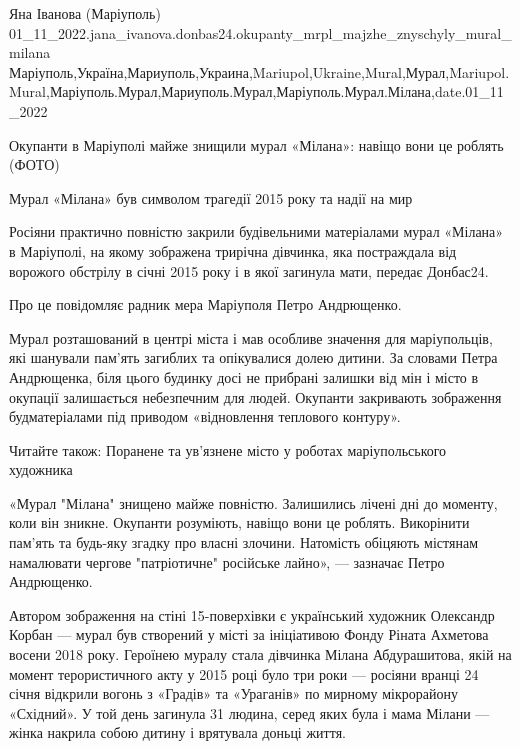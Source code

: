  
 
 
 
 

Яна Іванова (Маріуполь)
01_11_2022.jana_ivanova.donbas24.okupanty_mrpl_majzhe_znyschyly_mural_milana
Маріуполь,Україна,Мариуполь,Украина,Mariupol,Ukraine,Mural,Мурал,Mariupol.Mural,Маріуполь.Мурал,Мариуполь.Мурал,Маріуполь.Мурал.Мілана,date.01_11_2022

Окупанти в Маріуполі майже знищили мурал «Мілана»: навіщо вони це роблять
(ФОТО)

Мурал «Мілана» був символом трагедії 2015 року та надії на мир

Росіяни практично повністю закрили будівельними матеріалами мурал «Мілана» в
Маріуполі, на якому зображена трирічна дівчинка, яка постраждала від ворожого
обстрілу в січні 2015 року і в якої загинула мати, передає Донбас24.

Про це повідомляє радник мера Маріуполя Петро Андрющенко.

Мурал розташований в центрі міста і мав особливе значення для маріупольців, які
шанували пам'ять загиблих та опікувалися долею дитини. За словами Петра
Андрющенка, біля цього будинку досі не прибрані залишки від мін і місто в
окупації залишається небезпечним для людей. Окупанти закривають зображення
будматеріалами під приводом «відновлення теплового контуру».

Читайте також: Поранене та ув'язнене місто у роботах маріупольського художника

«Мурал "Мілана" знищено майже повністю. Залишились лічені дні до моменту, коли
він зникне. Окупанти розуміють, навіщо вони це роблять. Викорінити пам'ять та
будь-яку згадку про власні злочини. Натомість обіцяють містянам намалювати
чергове "патріотичне" російське лайно», — зазначає Петро Андрющенко.

Автором зображення на стіні 15-поверхівки є український художник Олександр
Корбан — мурал був створений у місті за ініціативою Фонду Ріната Ахметова
восени 2018 року. Героїнею муралу стала дівчинка Мілана Абдурашитова, якій на
момент терористичного акту у 2015 році було три роки — росіяни вранці 24 січня
відкрили вогонь з «Градів» та «Ураганів» по мирному мікрорайону «Східний». У
той день загинула 31 людина, серед яких була і мама Мілани — жінка накрила
собою дитину і врятувала доньці життя.

